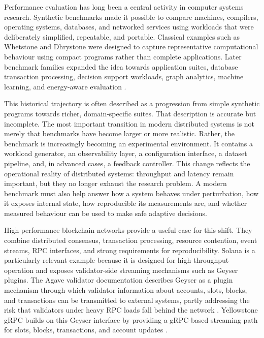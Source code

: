 \documentclass[11pt,a4paper]{article}
\begin{document}
Performance evaluation has long been a central activity in computer systems research. Synthetic benchmarks made it possible to compare machines, compilers, operating systems, databases, and networked services using workloads that were deliberately simplified, repeatable, and portable. Classical examples such as Whetstone and Dhrystone were designed to capture representative computational behaviour using compact programs rather than complete applications. Later benchmark families expanded the idea towards application suites, database transaction processing, decision support workloads, graph analytics, machine learning, and energy-aware evaluation \cite{weicker1984dhrystone,mdpi2025benchmarking}.

This historical trajectory is often described as a progression from simple synthetic programs towards richer, domain-specific suites. That description is accurate but incomplete. The most important transition in modern distributed systems is not merely that benchmarks have become larger or more realistic. Rather, the benchmark is increasingly becoming an experimental environment. It contains a workload generator, an observability layer, a configuration interface, a dataset pipeline, and, in advanced cases, a feedback controller. This change reflects the operational reality of distributed systems: throughput and latency remain important, but they no longer exhaust the research problem. A modern benchmark must also help answer how a system behaves under perturbation, how it exposes internal state, how reproducible its measurements are, and whether measured behaviour can be used to make safe adaptive decisions.

High-performance blockchain networks provide a useful case for this shift. They combine distributed consensus, transaction processing, resource contention, event streams, RPC interfaces, and strong requirements for reproducibility. Solana is a particularly relevant example because it is designed for high-throughput operation and exposes validator-side streaming mechanisms such as Geyser plugins. The Agave validator documentation describes Geyser as a plugin mechanism through which validator information about accounts, slots, blocks, and transactions can be transmitted to external systems, partly addressing the risk that validators under heavy RPC loads fall behind the network \cite{anza2026geyser}. Yellowstone gRPC builds on this Geyser interface by providing a gRPC-based streaming path for slots, blocks, transactions, and account updates \cite{rpcpool2026yellowstone}.
\end{document}
